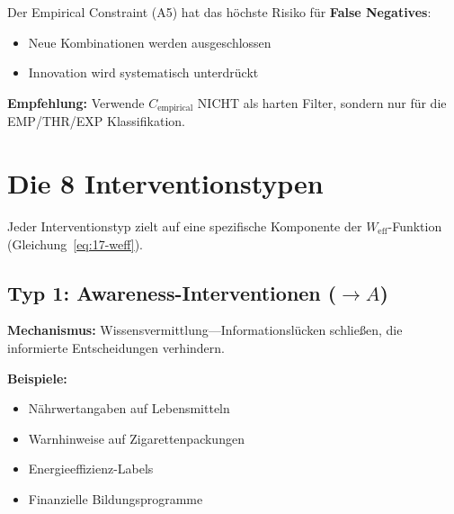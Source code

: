 \begin{tcolorbox}[colback=red!5!white, colframe=red!75!black,
    title=\textbf{Warnung: Absence of Evidence $\neq$ Evidence of Absence}]

Der Empirical Constraint (A5) hat das höchste Risiko für \textbf{False Negatives}:
\begin{itemize}[nosep]
\item Neue Kombinationen werden ausgeschlossen
\item Innovation wird systematisch unterdrückt
\end{itemize}

\textbf{Empfehlung:} Verwende $C_{\text{empirical}}$ NICHT als harten Filter, sondern nur für die EMP/THR/EXP Klassifikation.

\end{tcolorbox}



\section{Die 8 Interventionstypen}
\label{sec:17-types}

Jeder Interventionstyp zielt auf eine spezifische Komponente der $W_{\text{eff}}$-Funktion (Gleichung~\ref{eq:17-weff}).

\subsection{Typ 1: Awareness-Interventionen ($\rightarrow A$)}
\label{sec:17-type-awareness}

\textbf{Mechanismus:} Wissensvermittlung---Informationslücken schließen, die informierte Entscheidungen verhindern.

\textbf{Beispiele:}
\begin{itemize}[nosep]
\item Nährwertangaben auf Lebensmitteln
\item Warnhinweise auf Zigarettenpackungen
\item Energieeffizienz-Labels
\item Finanzielle Bildungsprogramme
\end{itemize}

